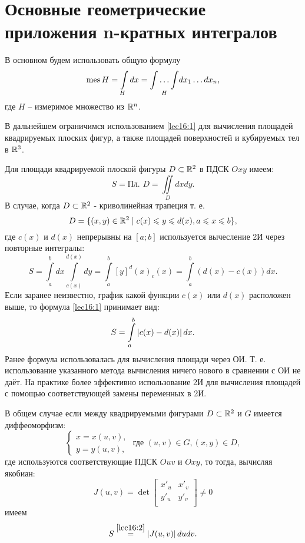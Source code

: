 \documentclass[../../main.tex]{subfiles}
\begin{document}
\section{Основные геометрические приложения n-кратных интегралов}

В основном будем использовать общую формулу
\begin{equation}
\label{lec16:1}
\operatorname{mes} H = \int\limits_Hdx = \underset{H}{\int \ldots \int}dx_1 \ldots dx_n,
\end{equation}
где $H$ -- измеримое множество из $\mathbb{R}^n$.

В дальнейшем ограничимся
использованием \eqref{lec16:1} для вычисления площадей квадрируемых плоских
фигур, а также площадей поверхностей и кубируемых тел в $\mathbb{R}^{3}$.

Для площади квадрируемой плоской фигуры $D \subset \mathbb{R}^{2}$ в ПДСК
$Oxy$ имеем:
\begin{equation}
\label{lec16:2}
S = \text{Пл. } D = \iint\limits_Ddxdy.
\end{equation}
В случае, когда $D \subset \mathbb{R}^{2}$ - криволинейная трапеция т. е. 
\begin{equation}
\label{lec16:3}
	D=\{
	(x,y)\in \mathbb{R}^2 \mid c(x)\leqslant y\leqslant d(x), a\leqslant x \leqslant b
	\},
\end{equation}
где $c(x)$ и $d(x)$ непрерывны на $\left[a; b\right]$
 используется вычесление 2И через повторные интегралы:
\begin{equation}
\label{lec16:4}
S = \int\limits_a^bdx\int\limits_{c(x)}^{d(x)}dy = 
\int\limits_a^b\left[y\right]^d(x)_c(x)
=\int\limits_a^b(d(x) - c(x))dx.
\end{equation}
Если заранее неизвестно, график какой функции  $c(x)$ или $d(x)$ 
расположен выше, то формула \eqref{lec16:1} принимает вид:
\begin{equation}
\label{lec16:5}
S =  \int\limits_a^b\left|{c(x) - d(x)}\right|dx.
\end{equation}
Ранее формула использовалась для вычисления
 площади через ОИ. Т. е. использование
  указанного метода вычисления {ничего нового}
в сравнении с ОИ не даёт. На практике
 более эффективно использование 2И для
  вычисления площадей с помощью соответствующей замены переменных в 2И.


В общем случае если между квадрируемыми фигурами 
$D\subset \mathbb{R}^2$ и $G$ имеется диффеоморфизм:
\begin{equation*}
\begin{cases}
x = x(u, v), \\
y = y(u, v),
\end{cases}
\text{ где }  (u, v) \in G, (x, y) \in D,
\end{equation*}
где используются соответствующие ПДСК $Ouv$ и $Oxy$, 
то тогда, вычисляя якобиан:
\begin{equation*}
J(u,v) = \det
\begin{bmatrix}
x'_u & x'_v\\
y'_u & y'_v\\
\end{bmatrix}
\neq 0
\end{equation*}
имеем
\begin{equation}
\label{lec16:6}
S \overset{\ref{lec16:2}}{=}  \left|{ J(u,v)}\right| dudv.
\end{equation}
\end{document}
